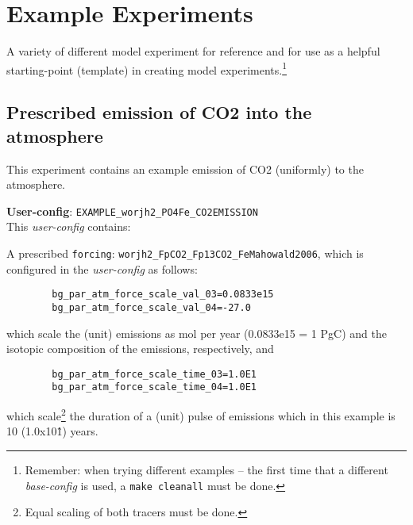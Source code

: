 \documentclass[10pt,twoside]{article}
\begin{document}

\newpage
\section{Example Experiments}\label{Example Experiments}

A variety of different model experiment for reference and for use as a helpful starting-point (template) in creating model experiments.\footnote{Remember: when trying different examples -- the first time that a different \textit{base-config} is used, a \texttt{make cleanall} must be done.}



\subsection{Prescribed emission of CO2 into the atmosphere}\label{EXAMPLE_worjh2_PO4Fe_CO2EMISSIONS}

This experiment contains an example emission of CO2 (uniformly) to the atmosphere.

\noindent \textbf{User-config}: \texttt{EXAMPLE\_worjh2\_PO4Fe\_CO2EMISSION}
\\ This \textit{user-config} contains:

\begin{compactitem}
	\item A prescribed \texttt{forcing}: \texttt{worjh2\_FpCO2\_Fp13CO2\_FeMahowald2006}, which is configured in the \textit{user-config} as follows:
	\begin{compactenum}
		\item 
		\begin{verbatim}
		bg_par_atm_force_scale_val_03=0.0833e15
		bg_par_atm_force_scale_val_04=-27.0
		\end{verbatim}
		which scale the (unit) emissions as mol per year (0.0833e15 = 1 PgC) and the isotopic composition of the emissions, respectively, and
		\item 
		\begin{verbatim}
		bg_par_atm_force_scale_time_03=1.0E1
		bg_par_atm_force_scale_time_04=1.0E1
		\end{verbatim}
		which scale\footnote{Equal scaling of both tracers must be done.} the duration of a (unit) pulse of emissions which in this example is 10 (1.0x10\^1) years.
	\end{compactenum}
\end{compactitem}
\end{document}

